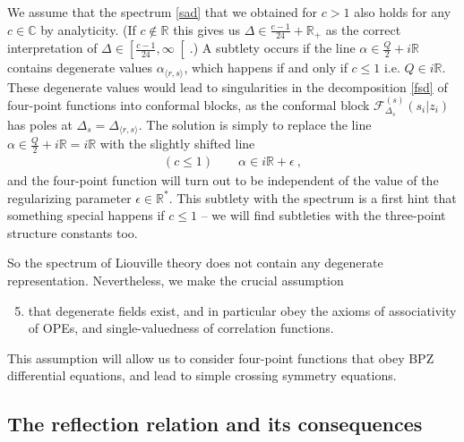 \documentclass[12pt, a4paper, notitlepage, twoside]{report}
\numberwithin{equation}{section}
\theoremstyle{break}
\begin{document}
We assume that the spectrum \eqref{sad} that we obtained for $c>1$ also holds for any $c\in\mathbb{C}$ by analyticity. 
(If $c\notin\mathbb{R}$  this gives us $\Delta \in \frac{c-1}{24} + \mathbb{R}_+$ as the correct interpretation of $\Delta \in \left[\frac{c-1}{24},\infty\right[$.)
A subtlety occurs if the line $\alpha \in \frac{Q}{2}+i\mathbb{R}$ contains degenerate values $\alpha_{\langle r, s\rangle}$, which happens if and only if $c\leq 1$ i.e. $Q\in i\mathbb{R}$. 
These degenerate values would lead to singularities in the decomposition \eqref{fsd} of four-point functions into conformal blocks, as the conformal block $\mathcal{F}_{\Delta_s}^{(s)}(s_i|z_i)$ has poles at $\Delta_s = \Delta_{\langle r, s\rangle}$. 
The solution is simply to replace the line $\alpha \in \frac{Q}{2} + i\mathbb{R} = i\mathbb{R}$ with the slightly shifted line 
\begin{align}
 (c\leq 1) \qquad \alpha \in i\mathbb{R} + \epsilon\ ,
\end{align}
and the four-point function will turn out to be independent of the value of the regularizing parameter $\epsilon \in \mathbb{R}^*$. 
This subtlety with the spectrum is a first hint that something special happens if $c\leq 1$ -- we will find subtleties with the three-point structure constants too. 

So the spectrum of Liouville theory does not contain any degenerate representation. 
Nevertheless, we make the crucial assumption 
\begin{enumerate}
\setcounter{enumi}{4}
 \item that degenerate fields exist, and in particular obey the axioms of associativity of OPEs, and single-valuedness of correlation functions.
\end{enumerate}
This assumption will allow us to consider four-point functions that obey BPZ differential equations, and lead to simple crossing symmetry equations.

\subsection{The reflection relation and its consequences}
\end{document}
